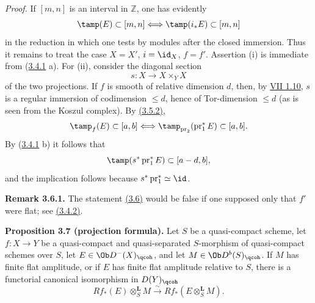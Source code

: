 \emph{Proof.} If \([m,n]\) is an interval in \(\mathbb Z\), one has evidently
\[
 \tamp(E)\subset[m,n] \Longleftrightarrow \tamp(i_*E)\subset[m,n]
\]
in the reduction in which one tests by modules after the closed immersion. Thus it remains to treat the case \(X=X'\), \(i=\id_X\), \(f=f'\). Assertion (i) is immediate from (\hyperlink{sga6.e03.cor.3-4-1}{3.4.1} a). For (ii), consider the diagonal section
\[
 s:X\longrightarrow X\times_YX
\]
of the two projections. If \(f\) is smooth of relative dimension \(d\), then, by \hyperlink{sga6.e07.prop.1-10}{VII 1.10}, \(s\) is a regular immersion of codimension \(\leq d\), hence of Tor-dimension \(\leq d\) (as is seen from the Koszul complex). By \hyperlink{sga6.e03.cor.3-5-2}{(3.5.2)},
\[
 \tamp_f(E)\subset[a,b]
 \Longleftrightarrow
 \tamp_{\operatorname{pr}_2}(\operatorname{pr}_1^*E)\subset[a,b].
\]
By (\hyperlink{sga6.e03.cor.3-4-1}{3.4.1} b) it follows that
\[
 \tamp(s^*\operatorname{pr}_1^*E)
 \subset[a-d,b],
\]
and the implication follows because \(s^*\operatorname{pr}_1^*\simeq\id\).

\textbf{Remark 3.6.1.} The statement \hyperlink{sga6.e03.prop.3-6}{(3.6)} would be false if one supposed only that \(f'\) were flat; see \hyperlink{sga6.e03.rem.3-4-2}{(3.4.2)}.

\textbf{Proposition 3.7 (projection formula).} Let \(S\) be a quasi-compact scheme, let \(f:X\to Y\) be a quasi-compact and quasi-separated \(S\)-morphism of quasi-compact schemes over \(S\), let \(E\in\Ob D^{-}(X)_{\qcoh}\), and let \(M\in\Ob D^b(S)_{\qcoh}\). If \(M\) has finite flat amplitude, or if \(E\) has finite flat amplitude relative to \(S\), there is a functorial canonical isomorphism in \(D(Y)_{\qcoh}\)
\[
 Rf_*(E)\otimes_S^{\mathbf L}M
 \xrightarrow{\sim}
 Rf_*(E\otimes_S^{\mathbf L}M).
\]

